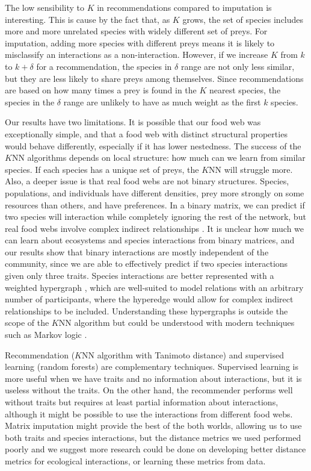 \documentclass[letterpaper]{article}
\begin{document}
The low sensibility to $K$ in recommendations compared to imputation is
interesting. This is cause by the fact that, as $K$ grows, the set of species
includes more and more unrelated species with widely different set of preys.
For imputation, adding more species with different preys means it is likely to
misclassify an interactions as a non-interaction. However, if we increase $K$
from $k$ to $k + \delta$ for a recommendation, the species in $\delta$ range
are not only less similar, but they are less likely to share preys among
themselves. Since recommendations are based on how many times a prey is found
in the $K$ nearest species, the species in the $\delta$ range are unlikely to
have as much weight as the first $k$ species.

Our results have two limitations. It is possible that our food web was
exceptionally simple, and that a food web with distinct structural properties
would behave differently, especially if it has lower nestedness. The success
of the $K$NN algorithms depends on local structure: how much can we learn from
similar species. If each species has a unique set of preys, the $K$NN will
struggle more. Also, a deeper issue is that real food webs are not binary
structures. Species, populations, and individuals have different densities,
prey more strongly on some resources than others, and have preferences. In a
binary matrix, we can predict if two species will interaction while completely
ignoring the rest of the network, but real food webs involve complex indirect
relationships \cite{woo94}. It is unclear how much we can learn about
ecosystems and species interactions from binary matrices, and our results show
that binary interactions are mostly independent of the community, since we are
able to effectively predict if two species interactions given only three
traits. Species interactions are better represented with a weighted hypergraph
\cite{gao12}, which are well-suited to model relations with an arbitrary
number of participants, where the hyperedge would allow for complex indirect
relationships to be included. Understanding these hypergraphs is outside the
scope of the $K$NN algorithm but could be understood with modern techniques
such as Markov logic \cite{ric06}.

Recommendation ($K$NN algorithm with Tanimoto distance) and supervised learning
(random forests) are complementary techniques. Supervised learning is more
useful when we have traits and no information about interactions, but it is
useless without the traits. On the other hand, the recommender performs well
without traits but requires at least partial information about interactions,
although it might be possible to use the interactions from different food webs.
Matrix imputation might provide the best of the both worlds, allowing us to use
both traits and species interactions, but the distance metrics we used
performed poorly and we suggest more research could be done on developing
better distance metrics for ecological interactions, or learning these
metrics from data.
\end{document}
